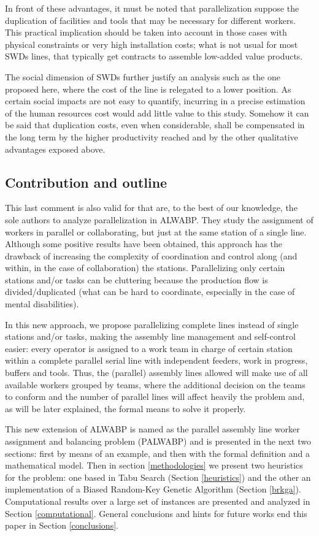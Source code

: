 \documentclass{singlecol-new}
\begin{document}
In front of these advantages, it must be noted that parallelization suppose the duplication of facilities and tools that may be necessary for different workers. This practical implication should be taken into account in those cases with physical constraints or very high installation costs; what is not usual for most SWDs lines, that typically get contracts to assemble low-added value products. 

The social dimension of SWDs further justify an analysis such as the one proposed here, where the cost of the line is relegated to a lower position. As certain social impacts are not easy to quantify, incurring in a precise estimation of the human resources cost would add little value to this study. Somehow it can be said that duplication costs, even when considerable, shall be compensated in the long term by the higher productivity reached and by the other qualitative advantages exposed above.

\subsection{Contribution and outline}

This last comment is also valid for \cite{araujo12two} that are, to the best of our knowledge, the sole authors to analyze parallelization in ALWABP. They study the assignment of workers in parallel or collaborating, but just at the same station of a single line. Although some positive results have been obtained, this approach has the drawback of increasing the complexity of coordination and control along (and within, in the case of collaboration) the stations. Parallelizing only certain stations and/or tasks can be cluttering because the production flow is divided/duplicated (what can be hard to coordinate, especially in the case of mental disabilities).

In this new approach, we propose parallelizing complete lines instead of single stations and/or tasks, making the assembly line management and self-control easier: every operator is assigned to a work team in charge of certain station within a complete parallel serial line with independent feeders, work in progress, buffers and tools. Thus, the (parallel) assembly lines allowed will make use of all available workers grouped by teams, where the additional decision on the teams to conform and the number of parallel lines will affect heavily the problem and, as will be later explained, the formal means to solve it properly. 

This new extension of ALWABP is named as the parallel assembly line worker assignment and balancing problem (PALWABP) and is presented in the next two sections: first by means of an example, and then with the formal definition and a mathematical model. Then in section \ref{methodologies} we present two heuristics for the problem: one based in Tabu Search (Section \ref{heuristics}) and the other an implementation of a Biased Random-Key Genetic Algorithm (Section \ref{brkga}). Computational results over a large set of instances are presented and analyzed in Section \ref{computational}. General conclusions and hints for future works end this paper in Section \ref{conclusions}.
\end{document}

